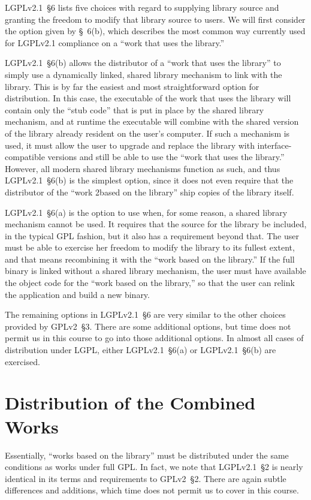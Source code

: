 LGPLv2.1~\S6 lists five choices with regard to supplying library source
and granting the freedom to modify that library source to users. We
will first consider the option given by \S~6(b), which describes the
most common way currently used for LGPLv2.1 compliance on a ``work that
uses the library.''

LGPLv2.1~\S6(b) allows the distributor of a ``work that uses the library'' to
simply use a dynamically linked, shared library mechanism to link with the
library. This is by far the easiest and most straightforward option for
distribution. In this case, the executable of the work that uses the
library will contain only the ``stub code'' that is put in place by the
shared library mechanism, and at runtime the executable will combine with
the shared version of the library already resident on the user's computer.
If such a mechanism is used, it must allow the user to upgrade and
replace the library with interface-compatible versions and still be able
to use the ``work that uses the library.''  However, all modern shared
library mechanisms function as such, and thus LGPLv2.1~\S6(b) is the simplest
option, since it does not even require that the distributor of the ``work
2based on the library'' ship copies of the library itself.

LGPLv2.1~\S6(a) is the option to use when, for some reason, a shared library
mechanism cannot be used. It requires that the source for the library be
included, in the typical GPL fashion, but it also has a requirement beyond
that. The user must be able to exercise her freedom to modify the library
to its fullest extent, and that means recombining it with the ``work based
on the library.''  If the full binary is linked without a shared library
mechanism, the user must have available the object code for the ``work
based on the library,'' so that the user can relink the application and
build a new binary.

The remaining options in LGPLv2.1~\S6 are very similar to the other choices
provided by GPLv2~\S3. There are some additional options, but time does
not permit us in this course to go into those additional options. In
almost all cases of distribution under LGPL, either LGPLv2.1~\S6(a) or LGPLv2.1~\S6(b) are
exercised.

\section{Distribution of the Combined Works}

Essentially, ``works based on the library'' must be distributed under the
same conditions as works under full GPL\@. In fact, we note that 
LGPLv2.1~\S2 is nearly identical in its terms and requirements to GPLv2~\S2.
There are again subtle differences and additions, which time does not
permit us to cover in this course.

